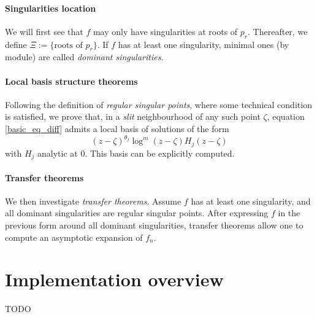 \documentclass[../main.tex]{subfiles}
\begin{document}
\paragraph*{Singularities location}
We will first see that $f$ may only have singularities at roots of $p_r$. Thereafter, we define $\Xi := \{ \text{roots of } p_r\}$. If $f$ has at least one singularity, minimal ones (by module) are called \emph{dominant singularities}.

\paragraph*{Local basis structure theorems}
Following the definition of \emph{regular singular points}, where some technical condition is satisfied, we prove that, in a \emph{slit} neighbourhood of any such point $\zeta$, equation \eqref{basic_eq_diff} admits a local basis of solutions of the form $${(z - \zeta)}^{\theta_j} \log^m (z - \zeta) H_j (z - \zeta)$$ with $H_j$ analytic at 0. This basis can be explicitly computed. 

\paragraph*{Transfer theorems}
We then investigate \emph{transfer theorems}. Assume $f$ has at least one singularity, and  all dominant singularities are regular singular points. After expressing $f$ in the previous form around all dominant singularities, transfer theorems allow one to compute an asymptotic expansion of $f_n$.


\section{Implementation overview}

TODO
\end{document}
